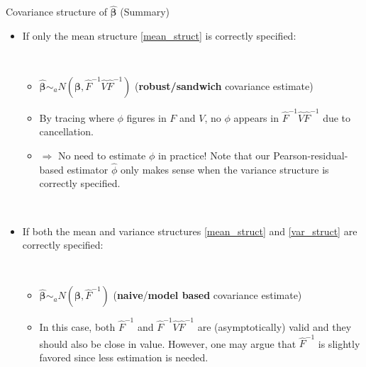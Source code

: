 \documentclass{beamer}
\newcommand{\boldbeta}{{\boldsymbol \beta}}
\newenvironment{wideitemize}%
  {\begin{itemize}%
    \setlength{\parskip}{1em}}%
  {\end{itemize}}
\begin{document}
\begin{frame}{Covariance structure of $\hat{\boldsymbol \beta}$ (Summary)}
\begin{itemize}
\item If only the mean structure \eqref{mean_struct} is correctly specified:

\ \
\begin{wideitemize}
\item $\hat{\boldbeta} \sim_a N( \boldbeta, \hat{F}^{-1} \hat{V} \hat{F}^{-1})$ ({\bf robust/sandwich } covariance estimate)
\item By tracing where $\phi$ figures in $F$ and $V$, no $\phi$ appears in $\hat{F}^{-1} \hat{V} \hat{F}^{-1}$ due to cancellation. 
\item $\Rightarrow$  No need to estimate $\phi$ in practice! Note that our Pearson-residual-based estimator $\hat{\phi}$ only makes sense when the variance structure is correctly specified.
\end{wideitemize}

\ \

\item If  both the mean and variance structures \eqref{mean_struct} and \eqref{var_struct} are correctly specified:

\ \

\begin{wideitemize}
\item $\hat{\boldbeta} \sim_a N( \boldbeta, \hat{F}^{-1} )$ ({\bf naive}/{\bf model based } covariance estimate)

\item In this case, both $\hat{F}^{-1} $ and $\hat{F}^{-1} \hat{V} \hat{F}^{-1}$ are  (asymptotically) valid and they should also be close in value.  However, one may argue that $\hat{F}^{-1} $ is slightly favored  since less estimation is needed. 
\end{wideitemize}


\end{itemize}

\end{frame}
\end{document}
